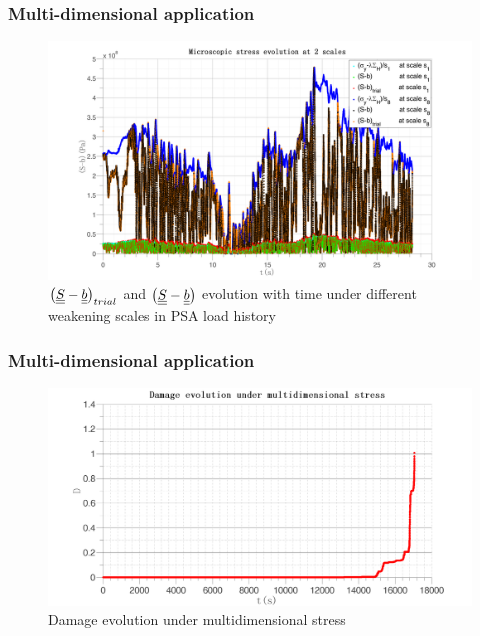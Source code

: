 \documentclass[xcolor=table]{Bredelebeamer}
\begin{document}
\begin{frame}
	\frametitle{Multi-dimensional application}
\begin{figure}[!h]
	\centering
	\includegraphics[width=\textwidth]{figures//trialreal3d.png} 
	\caption{$\left( \uline{\uline{S}}-\uline{\uline{b}}\right)_{trial}$ and $\left( \uline{\uline{S}}-\uline{\uline{b}}\right)$ evolution with time under different weakening scales in PSA load history}
	\label{trialreal3d2}
\end{figure} 
\end{frame}	
\begin{frame}
	\frametitle{Multi-dimensional application}
\begin{figure}[!h]
	\centering
	\includegraphics[width=\textwidth]{figures//damage3d2.png} 
	\caption{Damage evolution under multidimensional stress}
	\label{dam3d}
\end{figure}
\end{frame}	
\end{document}
